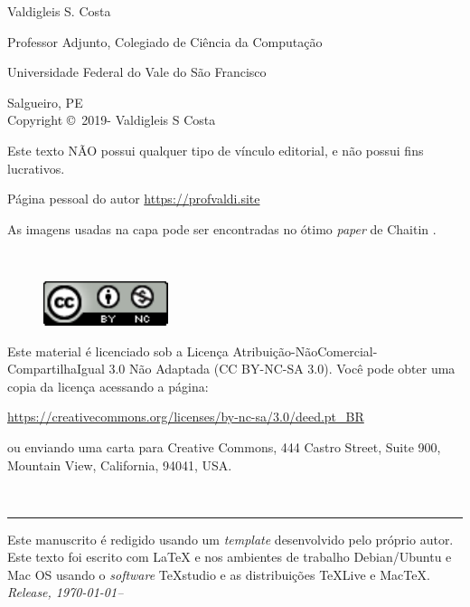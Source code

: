 \newpage
\noindent Valdigleis S. Costa

\noindent Professor Adjunto, Colegiado de Ciência da Computação

\noindent Universidade Federal do Vale do São Francisco

\noindent Salgueiro, PE\\

\noindent Copyright \copyright\ 2019-{\the\year} Valdigleis S Costa

\noindent Este texto  \textsc{NÃO}  possui qualquer tipo de vínculo editorial, e não possui fins lucrativos.

\noindent Página pessoal do autor \url{https://profvaldi.site}

\noindent As imagens usadas na capa pode ser encontradas no ótimo \textit{paper} de Chaitin \cite{chaitin2002figures}.

~\vfill

\thispagestyle{empty}


\begin{figure}[h]
	\centering
	\includegraphics[width=0.15\linewidth]{figures/license}
\end{figure}
\noindent Este material é licenciado sob a Licença Atribuição-NãoComercial-CompartilhaIgual 3.0 Não Adaptada (CC BY-NC-SA 3.0).  Você pode obter uma copia da licença acessando a página: 
\begin{center}
	\url{https://creativecommons.org/licenses/by-nc-sa/3.0/deed.pt_BR}
\end{center}
\noindent ou enviando uma carta para Creative Commons, 444 Castro Street, Suite 900, Mountain View, California, 94041, USA.

~\vfill

\thispagestyle{empty}

\hrule
\vspace*{1cm}

\noindent Este manuscrito é redigido usando um \textit{template} desenvolvido pelo próprio autor. Este texto foi escrito com {\LaTeX} e {\LaTeXe} nos ambientes de trabalho Debian/Ubuntu e Mac OS usando o \textit{software} TeXstudio e as distribuições  {\TeX}Live e Mac{\TeX}. \\ 

\noindent \textit{Release, \today--\currenttime} %
\newpage